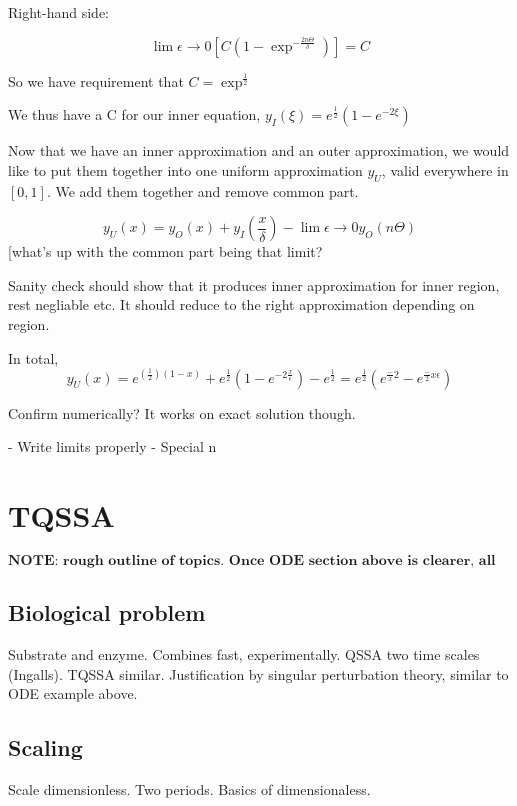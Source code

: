 \documentclass[12pt]{report}
\begin{document}
Right-hand side:

$$\lim \epsilon \to 0[C(1-\exp^{-\frac{2n \Theta}{\delta}})] = C$$

So we have requirement that $C = \exp^{\frac 1 2}$

We thus have a C for our inner equation, $y_I(\xi) = e^{\frac 1
2}(1-e^{-2\xi})$

Now that we have an inner approximation and an outer approximation, we would
like to put them together into one uniform approximation $y_U$, valid everywhere
in $[0,1]$. We add them together and remove common part.

$$y_U(x) = y_O(x) + y_I(\frac x \delta) - \lim \epsilon \to 0 y_O(n \Theta)$$
[what's up with the common part being that limit?

Sanity check should show that it produces inner approximation for inner region,
rest negliable etc. It should reduce to the right approximation depending on
region.

In total, $$y_U(x) = e^{(\frac 1 2)(1-x)} + e^{\frac 1 2}(1 - e^{-2\frac x
\epsilon}) - e^{\frac 1 2} = e^{\frac 1 2}(e^{\frac -x 2} - e^{\frac -2x
\epsilon})$$

Confirm numerically? It works on exact solution though.


- Write limits properly
- Special n

\chapter{TQSSA}

$\textbf{NOTE: rough outline of topics. Once ODE section above is clearer, all
components there except for scaling and translating the chemical reactions.
Section based on Lin/Segel chapter 10 (primarily), YZ-notes on QSSA and Khoo
TQSSA-justification}$

\section{Biological problem}

Substrate and enzyme. Combines fast, experimentally. QSSA two time scales
(Ingalls). TQSSA similar. Justification by singular perturbation theory, similar
to ODE example above.

\section{Scaling}

Scale dimensionless. Two periods. Basics of dimensionaless.
\end{document}
